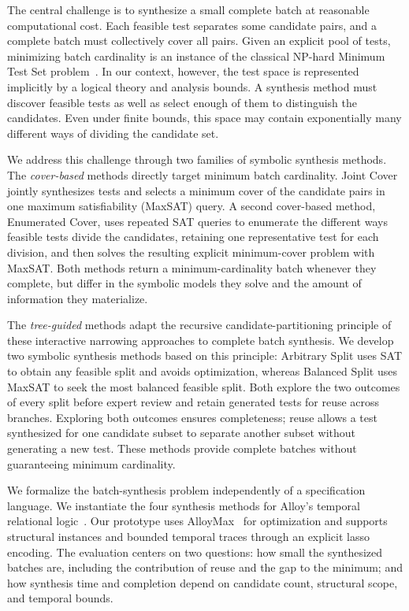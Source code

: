 \documentclass[runningheads]{llncs}
\newcommand{\methodname}[1]{\textup{\textsf{#1}}}
\newcommand{\arbitrarysplit}{\methodname{Arbitrary Split}}
\newcommand{\balancedsplit}{\methodname{Balanced Split}}
\newcommand{\jointcover}{\methodname{Joint Cover}}
\newcommand{\enumeratedcover}{\methodname{Enumerated Cover}}
\begin{document}
The central challenge is to synthesize a small complete batch at reasonable
computational cost. Each feasible test separates some candidate pairs, and a
complete batch must collectively cover all pairs. Given an explicit pool of
tests, minimizing batch cardinality is an instance of the classical NP-hard
Minimum Test Set problem~\cite{GareyJohnson,moret1985minimizing}. In our context, however,
the test space is represented implicitly by a logical theory and analysis
bounds. A synthesis method must discover feasible tests as well as select
enough of them to distinguish the candidates. Even under finite bounds, this
space may contain exponentially many different ways of dividing the
candidate set.

We address this challenge through two families of symbolic synthesis
methods. The \emph{cover-based} methods directly target minimum batch
cardinality. \jointcover{} jointly synthesizes tests and selects a minimum
cover of the candidate pairs in one maximum satisfiability (MaxSAT) query. A second
cover-based method, \enumeratedcover{}, uses repeated SAT queries to
enumerate the different ways feasible tests divide the candidates, retaining
one representative test for each
division, and then solves the resulting explicit minimum-cover problem with
MaxSAT. Both methods return a minimum-cardinality batch whenever they
complete, but differ in the
symbolic models they solve and the amount of information they materialize.

The \emph{tree-guided} methods adapt the recursive candidate-partitioning
principle of these interactive narrowing approaches to complete batch synthesis.
We develop two symbolic synthesis methods based
on this principle: \arbitrarysplit{} uses SAT to obtain any feasible split
and avoids optimization, whereas \balancedsplit{} uses MaxSAT to seek the
most balanced feasible split.
Both explore the two outcomes of every split before expert review and retain
generated tests for reuse across branches. Exploring both outcomes ensures
completeness; reuse allows a test synthesized for one candidate subset to
separate another subset without generating a new test. These methods provide
complete batches without guaranteeing minimum cardinality.

We formalize the batch-synthesis problem independently of a specification
language. We instantiate the four synthesis methods for Alloy's temporal relational
logic~\cite{jackson2012software,jackson2019alloy}. Our prototype uses
AlloyMax~\cite{zhang2021alloymax} for optimization and supports structural
instances and bounded temporal traces through an explicit lasso encoding. The
evaluation centers on two questions: how small the synthesized batches are,
including the contribution of reuse and the gap to the minimum; and how
synthesis time and completion depend on candidate count, structural scope,
and temporal bounds.
\end{document}
